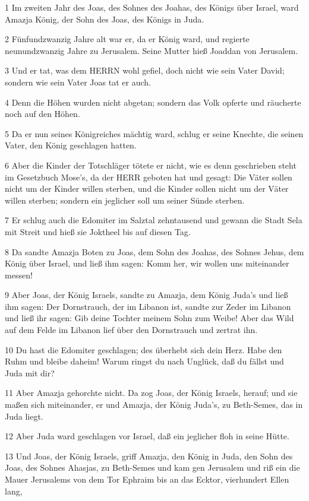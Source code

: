\par 1 Im zweiten Jahr des Joas, des Sohnes des Joahas, des Königs über Israel, ward Amazja König, der Sohn des Joas, des Königs in Juda.
\par 2 Fünfundzwanzig Jahre alt war er, da er König ward, und regierte neunundzwanzig Jahre zu Jerusalem. Seine Mutter hieß Joaddan von Jerusalem.
\par 3 Und er tat, was dem HERRN wohl gefiel, doch nicht wie sein Vater David; sondern wie sein Vater Joas tat er auch.
\par 4 Denn die Höhen wurden nicht abgetan; sondern das Volk opferte und räucherte noch auf den Höhen.
\par 5 Da er nun seines Königreiches mächtig ward, schlug er seine Knechte, die seinen Vater, den König geschlagen hatten.
\par 6 Aber die Kinder der Totschläger tötete er nicht, wie es denn geschrieben steht im Gesetzbuch Mose's, da der HERR geboten hat und gesagt: Die Väter sollen nicht um der Kinder willen sterben, und die Kinder sollen nicht um der Väter willen sterben; sondern ein jeglicher soll um seiner Sünde sterben.
\par 7 Er schlug auch die Edomiter im Salztal zehntausend und gewann die Stadt Sela mit Streit und hieß sie Joktheel bis auf diesen Tag.
\par 8 Da sandte Amazja Boten zu Joas, dem Sohn des Joahas, des Sohnes Jehus, dem König über Israel, und ließ ihm sagen: Komm her, wir wollen uns miteinander messen!
\par 9 Aber Joas, der König Israels, sandte zu Amazja, dem König Juda's und ließ ihm sagen: Der Dornstrauch, der im Libanon ist, sandte zur Zeder im Libanon und ließ ihr sagen: Gib deine Tochter meinem Sohn zum Weibe! Aber das Wild auf dem Felde im Libanon lief über den Dornstrauch und zertrat ihn.
\par 10 Du hast die Edomiter geschlagen; des überhebt sich dein Herz. Habe den Ruhm und bleibe daheim! Warum ringst du nach Unglück, daß du fällst und Juda mit dir?
\par 11 Aber Amazja gehorchte nicht. Da zog Joas, der König Israels, herauf; und sie maßen sich miteinander, er und Amazja, der König Juda's, zu Beth-Semes, das in Juda liegt.
\par 12 Aber Juda ward geschlagen vor Israel, daß ein jeglicher floh in seine Hütte.
\par 13 Und Joas, der König Israels, griff Amazja, den König in Juda, den Sohn des Joas, des Sohnes Ahasjas, zu Beth-Semes und kam gen Jerusalem und riß ein die Mauer Jerusalems von dem Tor Ephraim bis an das Ecktor, vierhundert Ellen lang,
